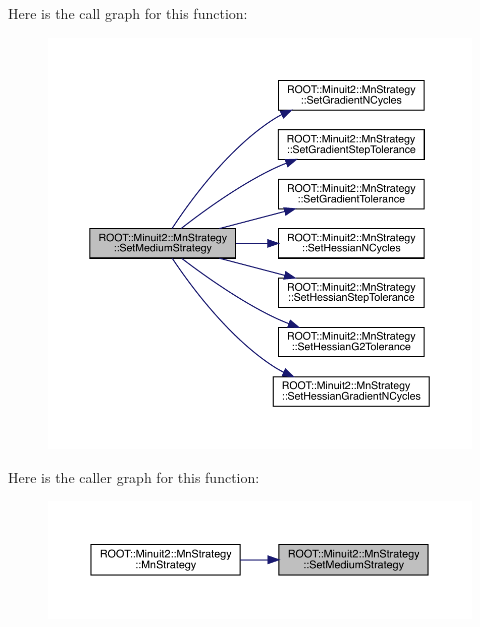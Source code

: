 Here is the call graph for this function\+:
\nopagebreak
\begin{figure}[H]
\begin{center}
\leavevmode
\includegraphics[width=350pt]{da/de4/classROOT_1_1Minuit2_1_1MnStrategy_ae813d1aedcf6fa8f2bfb09a501a783f4_cgraph}
\end{center}
\end{figure}
Here is the caller graph for this function\+:
\nopagebreak
\begin{figure}[H]
\begin{center}
\leavevmode
\includegraphics[width=350pt]{da/de4/classROOT_1_1Minuit2_1_1MnStrategy_ae813d1aedcf6fa8f2bfb09a501a783f4_icgraph}
\end{center}
\end{figure}
\mbox{\label{classROOT_1_1Minuit2_1_1MnStrategy_ae813d1aedcf6fa8f2bfb09a501a783f4}} 
